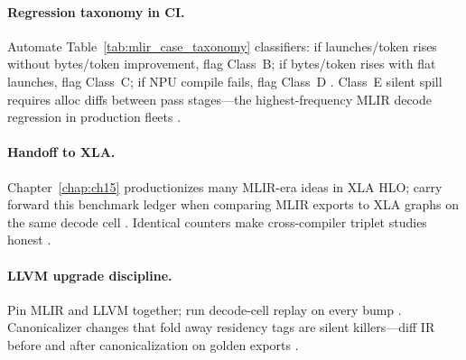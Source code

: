 \paragraph{Regression taxonomy in CI.} Automate Table~\ref{tab:mlir_case_taxonomy} classifiers: if launches/token rises without bytes/token improvement, flag Class~B; if bytes/token rises with flat launches, flag Class~C; if NPU compile fails, flag Class~D \citep{yirage2026,memoryfloor2026,taxbreak2026,chen2020compilerbasedhardw,patel2025llminference,kwon2023vllm,liu2024deepseekv3,amd2024aie,amd2024xdna,dao2022flashattention,dao2023flashdecoding,nvidia2024cudagraphs,nvidia2022hopper,semianalysis2024tma,dlbook}. Class~E silent spill requires alloc diffs between pass stages---the highest-frequency MLIR decode regression in production fleets \citep{memoryfloor2026,yirage2026,chen2020compilerbasedhardw,taxbreak2026,patel2025llminference,kwon2023vllm,liu2024deepseekv3,amd2024aie,amd2024xdna,dao2022flashattention,dao2023flashdecoding,nvidia2024cudagraphs,nvidia2022hopper,semianalysis2024tma,dlbook}.

\paragraph{Handoff to XLA.} Chapter~\ref{chap:ch15} productionizes many MLIR-era ideas in XLA HLO; carry forward this benchmark ledger when comparing MLIR exports to XLA graphs on the same decode cell \citep{yirage2026,chen2020compilerbasedhardw,patel2025llminference,memoryfloor2026,taxbreak2026,kwon2023vllm,liu2024deepseekv3,amd2024aie,amd2024xdna,dao2022flashattention,dao2023flashdecoding,nvidia2024cudagraphs,nvidia2022hopper,semianalysis2024tma,dlbook}. Identical counters make cross-compiler triplet studies honest \citep{yirage2026,chen2020compilerbasedhardw,patel2025llminference,memoryfloor2026,taxbreak2026,kwon2023vllm,liu2024deepseekv3,amd2024aie,amd2024xdna,dao2022flashattention,dao2023flashdecoding,nvidia2024cudagraphs,nvidia2022hopper,semianalysis2024tma,dlbook}.


\paragraph{LLVM upgrade discipline.} Pin MLIR and LLVM together; run decode-cell replay on every bump \citep{chen2020compilerbasedhardw,liu2024deepseekv3,yirage2026,memoryfloor2026,taxbreak2026,patel2025llminference,kwon2023vllm,amd2024aie,amd2024xdna,dao2022flashattention,dao2023flashdecoding,nvidia2024cudagraphs,nvidia2022hopper,semianalysis2024tma,dlbook}. Canonicalizer changes that fold away residency tags are silent killers---diff IR before and after canonicalization on golden exports \citep{yirage2026,chen2020compilerbasedhardw,patel2025llminference,memoryfloor2026,taxbreak2026,kwon2023vllm,liu2024deepseekv3,amd2024aie,amd2024xdna,dao2022flashattention,dao2023flashdecoding,nvidia2024cudagraphs,nvidia2022hopper,semianalysis2024tma,dlbook}.

